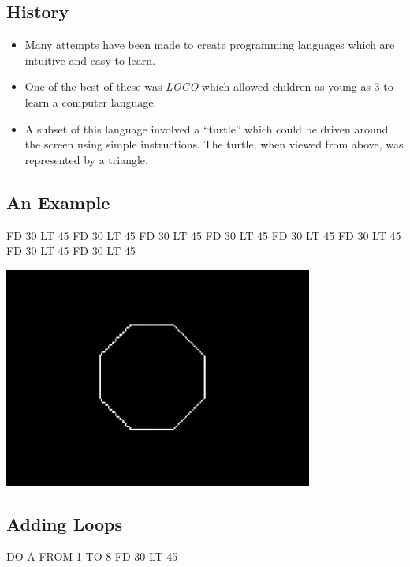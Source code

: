 
\subsection*{History}
\begin{itemize}
\item Many attempts have been made to create programming languages
which are intuitive and easy to learn.
\item One of the best of these was {\it LOGO} which allowed
children as young as 3 to learn a computer language.
\item A subset of this language involved a ``turtle'' which
could be driven around the screen using simple instructions.
The turtle, when viewed from above, was represented by a triangle.
\end{itemize}

\subsection*{An Example}
\begin{codesnippet}
{
 FD 30
 LT 45
 FD 30
 LT 45
 FD 30
 LT 45
 FD 30
 LT 45
 FD 30
 LT 45
 FD 30
 LT 45
 FD 30
 LT 45
 FD 30
 LT 45
}
\end{codesnippet}
\begin{center}
\includegraphics[width=4in]{../Pictures/octagon.jpg}
\end{center}


\subsection*{Adding Loops}
\begin{codesnippet}
{
   DO A FROM 1 TO 8 {
      FD 30
      LT 45
   }
}
\end{codesnippet}

